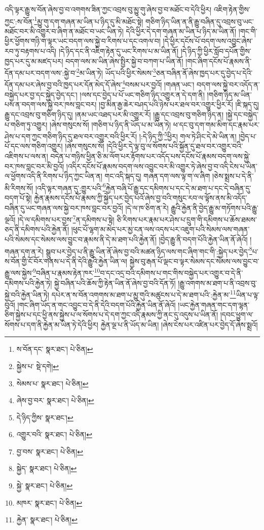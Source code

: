 འདི་ལྟར་རྒྱུ་ས་བོན་ཞེས་བྱ་བ་འགགས་ཟིན་ཀྱང་འབྲས་བུ་མྱུ་གུ་ཞེས་བྱ་བ་མཐོང་བ་དེའི་ཕྱིར། འཇིག་རྟེན་གྱིས་ཀྱང་:ས་བོན་\footnote{ས་བོན་དང་  སྣར་ཐང་།  པེ་ཅིན། }མྱུ་གུ་དག་གཞན་མ་ཡིན་པ་ཉིད་དུ་མི་མཐོང་སྟེ། གཅིག་ཉིད་ཡིན་ན་ནི་རྒྱུ་བཞིན་དུ་འབྲས་བུ་ཡང་མཐོང་བར་མི་འགྱུར་བ་ཞིག་ན་མཐོང་བ་ཡང་ཡིན་ཏེ། དེའི་ཕྱིར་དེ་དག་གཞན་མ་ཡིན་པ་ཉིད་མ་ཡིན་ནོ། །གང་གི་ཕྱིར་ཕྱོགས་གཉི་ག་ལྟར་ཡང་བདག་ལས་སྐྱེ་བ་རིགས་པ་དང་འགལ་བ། །དེ་ཕྱིར་དངོས་པོ་བདག་ལས་འབྱུང་ཞེས་རབ་ཏུ་བརྟགས་པ་འདི། །དེ་ཉིད་དང་ནི་འཇིག་རྟེན་དུ་ཡང་རིགས་པ་མ་ཡིན་ནོ། །དེ་ཉིད་ཀྱི་ཕྱིར་སློབ་དཔོན་གྱིས་ཁྱད་པར་དུ་མ་མཛད་པར། བདག་ལས་མ་ཡིན་ཞེས་སྤྱིར་སྐྱེ་བ་བཀག་པ་ཡིན་ནོ། །གང་ཞིག་དངོས་པོ་རྣམས་ནི་དོན་དམ་པར་བདག་ལས་:སྐྱེ་བ་\footnote{སྐྱེས་པ་  སྡེ་དགེ། }མ་ཡིན་ཏེ། ཡོད་པའི་ཕྱིར་སེམས་\footnote{སེམས་པ་  སྣར་ཐང་།  པེ་ཅིན། }ཅན་བཞིན་ནོ་ཞེས་ཁྱད་པར་དུ་བྱེད་པ་དེའི་དོན་དམ་པར་ཞེས་བྱ་བའི་ཁྱད་པར་དོན་མེད་དོ་ཞེས་\footnote{ཞེས་བྱ་བར་  སྣར་ཐང་།  པེ་ཅིན། }བསམ་པར་བྱའོ། །གཞན་ཡང་། བདག་ལས་སྐྱེ་བར་འདོད་ན་བསྐྱེད་པར་བྱ་དང་སྐྱེད་བྱེད་དང་། །ལས་དང་བྱེད་པ་པོ་ཡང་གཅིག་ཉིད་འགྱུར་ན་དེ་དག་ནི། །གཅིག་ཉིད་མ་ཡིན་པས་ན་བདག་ལས་སྐྱེ་བར་ཁས་བླང་བར། །བྱ་མིན་རྒྱ་ཆེར་བཤད་པའི་ཉེས་པར་ཐལ་བར་འགྱུར་ཕྱིར་རོ། །ཇི་སྐད་དུ། རྒྱུ་དང་འབྲས་བུ་གཅིག་ཉིད་དུ། །ནམ་ཡང་འཐད་པར་མི་འགྱུར་རོ། །རྒྱུ་དང་འབྲས་བུ་གཅིག་ཉིད་ན། །སྐྱེ་དང་བསྐྱེད་པ་གཅིག་ཏུ་འགྱུར། །ཞེས་གསུངས་སོ། །གཅིག་པ་ཉིད་ནི་ཡོད་པ་མ་ཡིན་ཏེ། ཕ་དང་བུ་དག་གམ་མིག་དང་རྣམ་པར་ཤེས་པ་དག་ཀྱང་གཅིག་ཉིད་དུ་ཐལ་བར་འགྱུར་བའི་ཕྱིར་རོ། །:དེ་ཉིད་ཀྱི་\footnote{དེ་ཉིད་ཀྱིས་  སྣར་ཐང་། }ཕྱིར། གལ་ཏེ་ཤིང་དེ་མེ་ཡིན་ན། །བྱེད་པ་པོ་དང་ལས་གཅིག་འགྱུར། །ཞེས་གསུངས་སོ། །དེའི་ཕྱིར་དེ་ལྟ་བུ་ལ་སོགས་པའི་སྐྱོན་དུ་ཐལ་བར་འགྱུར་བའི་འཇིགས་པ་ལས་ན། བདེན་པ་གཉིས་ཕྱིན་ཅི་མ་ལོག་པར་རྟོགས་པར་འདོད་པས་དངོས་པོ་རྣམས་བདག་ལས་སྐྱེ་བར་ཁས་བླང་བར་མི་བྱའོ། །འདིར་དངོས་པོ་རྣམས་བདག་ལས་འབྱུང་བར་མི་འགྱུར་ཏེ་ཞེས་བྱ་བ་འདི་ངེས་པ་ཡིན་ལ་ཕྱོགས་འདི་ནི་རིགས་པ་ཉིད་ཀྱང་ཡིན་ན། གང་འདི་སྐད་དུ། གཞན་དག་ལས་ལྟ་ག་ལ་ཞིག །ཅེས་སྨྲས་པ་དེ་ནི་མི་རིགས་སོ། །འདི་ལྟར་གཞན་དུ་:གྱུར་པའི་\footnote{འགྱུར་བའི་  སྣར་ཐང་།  པེ་ཅིན། }རྐྱེན་བཞི་པོ་རྒྱུ་དང་དམིགས་པ་དང་དེ་མ་ཐག་པ་དང་དེ་བཞིན་དུ་བདག་པོ་སྟེ། རྐྱེན་རྣམས་དངོས་པོ་རྣམས་ཀྱི་སྐྱེད་པར་བྱེད་པའོ་ཞེས་བྱ་བའི་གསུང་རབ་ལ་ལྟོས་ནས་མི་འདོད་བཞིན་དུ་ཡང་གཞན་ལས་སྐྱེ་བར་ཁས་བླང་བར་བྱའོ། །དེ་ལ་ཁ་ཅིག་ན་རེ། རྒྱུའི་རྐྱེན་ནི་བྱེད་རྒྱུ་མ་གཏོགས་པའི་རྒྱུ་ལྔའོ། །དེ་ལ་དམིགས་པར་བྱས་\footnote{བྱ་བས་  སྣར་ཐང་།  པེ་ཅིན། }ན་དམིགས་པ་སྟེ། ཅི་རིགས་པར་རྣམ་པར་ཤེས་པ་དྲུག་གི་དམིགས་པ་ཆོས་ཐམས་ཅད་ནི་དམིགས་པའི་རྐྱེན་ནོ། །ཕུང་པོ་ལྷག་མ་མེད་པར་མྱ་ངན་ལས་འདས་པར་འཇུག་པའི་སེམས་ལས་གཞན་པའི་སེམས་དང་སེམས་ལས་བྱུང་བ་རྣམས་ནི་དེ་མ་ཐག་པའི་རྐྱེན་ནོ། །བྱེད་རྒྱུ་ནི་བདག་པོའི་རྐྱེན་ཡིན་ནོ་ཞེའོ། །གཞན་དག་ན་རེ། སྒྲུབ་པར་བྱེད་པ་ནི་རྒྱུ་ཡིན་ནོ་ཞེས་བྱ་བའི་མཚན་ཉིད་ལས་གང་ཞིག་གང་གི་:སྐྱེད་པར་བྱེད་\footnote{སྐྱེད་  སྣར་ཐང་།  པེ་ཅིན། }པ་ས་བོན་གྱི་ངོ་བོར་གནས་པ་དེ་ནི་དེའི་རྒྱུའི་རྐྱེན་ཡིན་ལ། སྐྱེས་བུ་རྒན་པོ་ལྡང་བ་ལྟར་སེམས་དང་སེམས་ལས་བྱུང་བ་རྒྱུ་ལས་སྐྱེས་\footnote{སྐྱེ་  སྣར་ཐང་།  པེ་ཅིན། }བཞིན་པ་རྣམས་རྟེན་ཁར་\footnote{མཁར་  སྣར་ཐང་།  པེ་ཅིན། }བ་དང་འདྲ་བའི་དམིགས་པ་གང་གིས་བསྐྱེད་པར་འགྱུར་བ་དེ་ནི་དམིགས་པའི་རྐྱེན་ཏེ། སྐྱེ་བཞིན་པའི་ཆོས་ཀྱི་རྟེན་ཡིན་ནོ་ཞེས་བྱ་བའི་དོན་ཏོ། །རྒྱུ་འགགས་མ་ཐག་པ་ནི་འབྲས་བུ་སྐྱེ་བའི་རྐྱེན་ཡིན་ཏེ། དཔེར་ན་ས་བོན་འགགས་མ་ཐག་པ་མྱུ་གུའི་མཚུངས་པ་དེ་མ་ཐག་པའི་:རྐྱེན་མ་\footnote{རྐྱེན་  སྣར་ཐང་།  པེ་ཅིན། }ཡིན་པ་ལྟ་བུའོ། །གང་ཞིག་ཡོད་ན་གང་འབྱུང་བ་དེ་ནི་དེའི་བདག་པོའི་རྐྱེན་ཡིན་ནོ་ཞེའོ། །ཡང་རྐྱེན་གཞན་གང་དག་ལྷན་ཅིག་སྐྱེས་པ་དང་ཕྱི་ནས་སྐྱེས་པ་ལ་སོགས་པ་དེ་དག་ཀྱང་འདི་རྣམས་ཀྱི་ནང་དུ་འདུས་པ་ཡིན་ནོ། །དབང་ཕྱུག་ལ་སོགས་པ་དག་ནི་རྐྱེན་མ་ཡིན་ཏེ་དེའི་ཕྱིར། རྐྱེན་ལྔ་པ་ནི་ཡོད་མ་ཡིན། །ཞེས་ངེས་པར་འཛིན་པར་བྱེད་དོ་ཞེས་སྨྲའོ། 